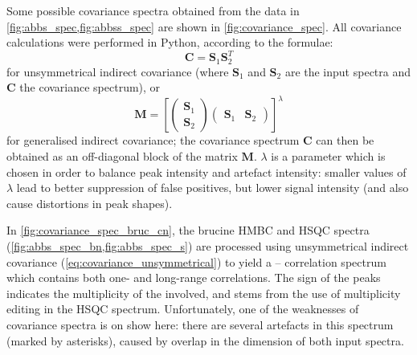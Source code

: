 Some possible covariance spectra obtained from the data in \cref{fig:abbs_spec,fig:abbss_spec} are shown in \cref{fig:covariance_spec}.
All covariance calculations were performed in Python, according to the formulae:
\begin{equation}
    \label{eq:covariance_unsymmetrical}
    \symbf{C} = \symbf{S}_1\symbf{S}_2^T
\end{equation}
for unsymmetrical indirect covariance (where $\symbf{S}_1$ and $\symbf{S}_2$ are the input spectra and $\symbf{C}$ the covariance spectrum), or
\begin{equation}
    \label{eq:covariance_generalised}
    \symbf{M} = \left[\begin{pmatrix}\symbf{S}_1 \\ \symbf{S}_2\end{pmatrix}
    \begin{pmatrix}\symbf{S}_1 & \symbf{S}_2 \end{pmatrix}\right]^\lambda
\end{equation}
for generalised indirect covariance; the covariance spectrum $\symbf{C}$ can then be obtained as an off-diagonal block of the matrix $\symbf{M}$.
$\lambda$ is a parameter which is chosen in order to balance peak intensity and artefact intensity\autocite{Snyder2009JPCA}: smaller values of $\lambda$ lead to better suppression of false positives, but lower signal intensity (and also cause distortions in peak shapes).

In \cref{fig:covariance_spec_bruc_cn}, the brucine \nitrogen{} HMBC and \carbon{} HSQC spectra  (\cref{fig:abbs_spec_bn,fig:abbs_spec_s}) are processed using unsymmetrical indirect covariance (\cref{eq:covariance_unsymmetrical}) to yield a \carbon{}--\nitrogen{} correlation spectrum which contains both one- and long-range correlations.\autocite{Martin2007JHC,Martin2007MRC}
The sign of the peaks indicates the multiplicity of the \carbon{} involved, and stems from the use of multiplicity editing in the \carbon{} HSQC spectrum.
Unfortunately, one of the weaknesses of covariance spectra is on show here: there are several artefacts in this spectrum (marked by asterisks), caused by overlap in the \proton{} dimension of both input spectra.

